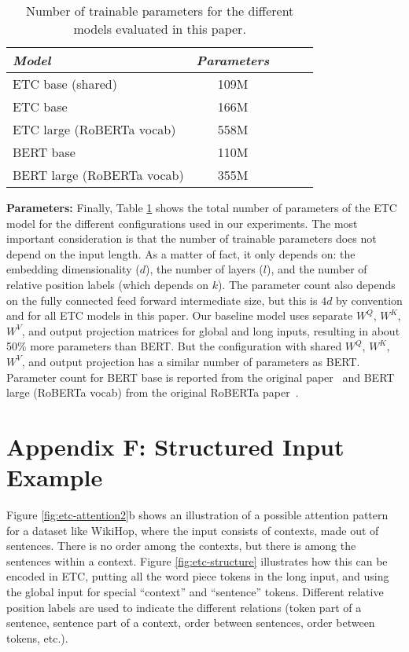 \documentclass[11pt,a4paper]{article}
\begin{document}
\begin{table}[tb]\centering 
\begin{tabular}{lcccc} 
{\em Model} & {\em Parameters} \\ \hline
ETC base (shared)   &   109M \\
ETC base            &   166M \\
ETC large (RoBERTa vocab) &   558M  \\ \hline
BERT base                   &  110M  \\
BERT large (RoBERTa vocab)  &  355M  \\  
\end{tabular}							
\caption{Number of trainable parameters for the different models evaluated in this paper.}
\label{tbl:parameters} 
\end{table}



{\bf Parameters:} Finally, Table \ref{tbl:parameters} shows the total number of parameters of the ETC model for the different configurations used in our experiments. The most important consideration is that the number of trainable parameters does not depend on the input length. As a matter of fact, it only depends on: the embedding dimensionality ($d$), the number of layers ($l$), and the number of relative position labels (which depends on $k$).
The parameter count also depends on the fully connected feed forward intermediate size, but this is $4d$ by convention and for all ETC models in this paper. Our baseline model uses separate $W^Q$, $W^K$, $W^V$, and output projection matrices for global and long inputs, resulting in about 50\% more parameters than BERT. But the configuration with shared  $W^Q$, $W^K$, $W^V$, and output projection has a similar number of parameters as BERT. Parameter count for BERT base is reported from the original paper~\cite{devlin2018bert} and BERT large (RoBERTa vocab) from the original RoBERTa paper~\cite{liu2019roberta}.









\section*{Appendix F: Structured Input Example}\label{app:structure}

Figure \ref{fig:etc-attention2}b shows an illustration of a possible attention pattern for a dataset like WikiHop, where the input consists of contexts, made out of sentences. There is no order among the contexts, but there is among the sentences within a context. Figure \ref{fig:etc-structure} illustrates how this can be encoded in ETC, putting all the word piece tokens in the long input, and using the global input for special ``context'' and ``sentence'' tokens. Different relative position labels are used to indicate the different relations (token part of a sentence, sentence part of a context, order between sentences, order between tokens, etc.).
\end{document}
